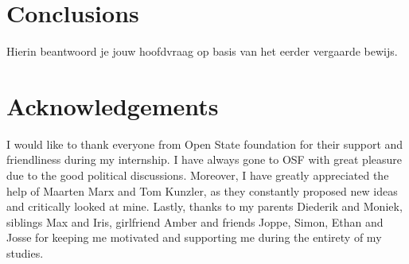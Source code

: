\section{Conclusions}
\label{sec:conc}

Hierin beantwoord je jouw hoofdvraag op basis van het eerder vergaarde bewijs.



\section{Acknowledgements}
I would like to thank everyone from Open State foundation for their support and friendliness during my internship. I have always gone to OSF with great pleasure due to the good political discussions. Moreover, I have greatly appreciated the help of Maarten Marx and Tom Kunzler, as they constantly proposed new ideas and critically looked at mine. Lastly, thanks to my parents Diederik and Moniek, siblings Max and Iris, girlfriend Amber and friends Joppe, Simon, Ethan and Josse for keeping me motivated and supporting me during the entirety of my studies.